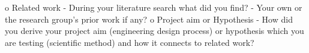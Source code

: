 o Related work - During your literature search what did you find? - Your own or the research group's prior work if any?
o Project aim or Hypothesis - How did you derive your project aim (engineering design process) or hypothesis which you are testing (scientific method) and how it connects to related work?

